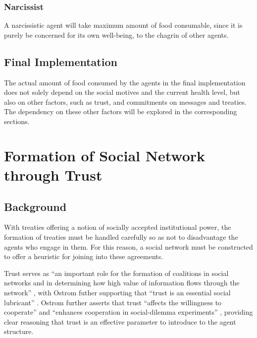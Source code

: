 \subsubsection{Narcissist}

A narcissistic agent will take maximum amount of food consumable, since it is purely be concerned for its own well-being, to the chagrin of other agents.


\subsection{Final Implementation}
The actual amount of food consumed by the agents in the final implementation does not solely depend on the social motives and the current health level, but also on other factors, such as trust, and commitments on messages and treaties. The dependency on these other factors will be explored in the corresponding sections.


\section{Formation of Social Network through Trust}\label{trust}

\subsection{Background}

With treaties offering a notion of socially accepted institutional power, the formation of treaties must be handled carefully so as not to disadvantage the agents who engage in them. For this reason, a social network must be constructed to offer a heuristic for joining into these agreements. 

Trust serves as ``an important role for the formation of coalitions in social networks and in determining how high value of information flows through the network'' \cite{trustEEE}, with Ostrom futher supporting that ``trust is an essential social lubricant'' \cite{ostrom2003trust}. Ostrom further asserts that trust ``affects the willingness to cooperate'' \cite{ostrom2003trust} and ``enhances cooperation in social-dilemma experiments'' \cite{ostrom2003trust}, providing clear reasoning that trust is an effective parameter to introduce to the agent structure.

